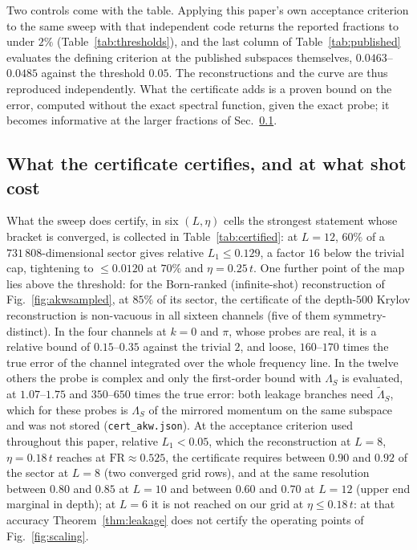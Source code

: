 %
%
%
Two controls come with the table. Applying this paper's own acceptance criterion to the same sweep with
that independent code returns the reported fractions to under $2\%$ (Table~\ref{tab:thresholds}), and
the last column of Table~\ref{tab:published} evaluates the defining criterion at the published
subspaces themselves, $0.0463$--$0.0485$ against the threshold $0.05$. The reconstructions and the
curve are thus reproduced independently. What the certificate adds is a proven bound on the error,
computed without the exact spectral function, given the exact probe; it becomes informative at the
larger fractions of Sec.~\ref{sec:frontier:certified}.

\subsection{What the certificate certifies, and at what shot cost}
\label{sec:frontier:certified}

What the sweep does certify, in six $(L,\eta)$ cells the strongest statement whose bracket is converged, is
collected in Table~\ref{tab:certified}: at $L=12$, $60\%$ of a $731\,808$-dimensional sector gives
relative $L_1\le0.129$, a factor $16$ below the trivial cap, tightening to $\le0.0120$ at $70\%$ and
$\eta=0.25\,t$. One further point of the map lies above the threshold: for the Born-ranked
(infinite-shot) reconstruction of Fig.~\ref{fig:akwsampled}, at $85\%$ of its sector, the certificate
of the depth-$500$ Krylov reconstruction is non-vacuous in all sixteen channels (five of them
symmetry-distinct). In the four channels at $k=0$ and $\pi$, whose probes are real, it is a relative bound of
$0.15$--$0.35$ against the trivial $2$, and loose, $160$--$170$ times the true error of the channel
integrated over the whole frequency line. In the twelve others the probe is complex and only the
first-order bound with $\Lambda_S$ is evaluated, at $1.07$--$1.75$ and
$350$--$650$ times the true error: both leakage branches need $\tilde\Lambda_S$, which for these probes is $\Lambda_S$ of the mirrored momentum on the same
subspace and was not stored (\texttt{cert\_akw.json}). At the acceptance criterion used
throughout this paper, relative $L_1<0.05$, which the reconstruction at $L=8$, $\eta=0.18\,t$ reaches at
%
%
%
%
%
%
%
%
%
$\mathrm{FR}\approx0.525$, the certificate requires between $0.90$ and $0.92$ of the sector at $L=8$ (two
converged grid rows), and at the same resolution between $0.80$ and $0.85$ at $L=10$ and between $0.60$ and
$0.70$ at $L=12$ (upper end marginal in depth); at $L=6$ it is not reached on our grid at
$\eta\le0.18\,t$: at that
%
%
accuracy Theorem~\ref{thm:leakage} does not certify the operating points of Fig.~\ref{fig:scaling}.

